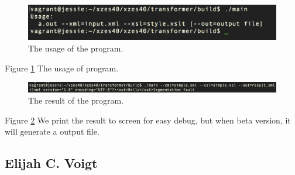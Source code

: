 \begin{figure}
  \includegraphics[width=\linewidth]{./figures/usage_of_program.png}
  \caption{The usage of the program.}
  \label{fig:screen2}
\end{figure}
Figure \ref{fig:screen2} The usage of program.

\begin{figure}
  \includegraphics[width=\linewidth]{./figures/result_of_program.png}
  \caption{The result of the program.}
  \label{fig:screen3}
\end{figure}
Figure \ref{fig:screen3} We print the result to screen for easy debug, but when beta version, it will generate a output file.


\subsection{Elijah C. Voigt}

\printbibliography


